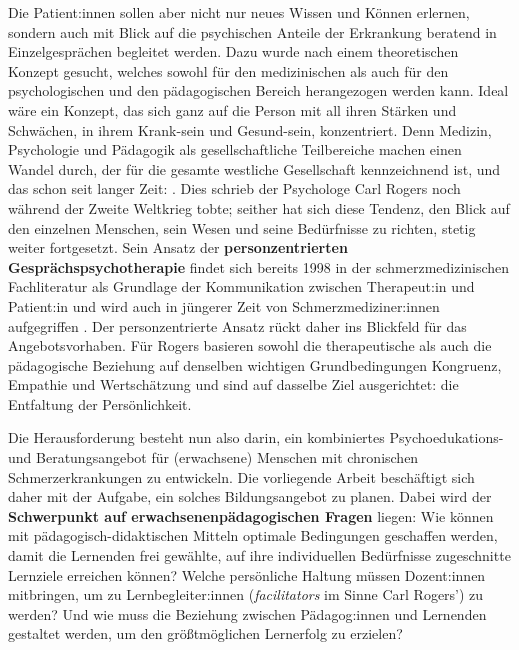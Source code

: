 \documentclass[
  twoside,
  parskip=half-,
]{scrreprt}
\begin{document}
    Die Patient:innen sollen aber nicht nur neues Wissen und Können erlernen, sondern auch mit Blick auf die psychischen Anteile der Erkrankung beratend in Einzelgesprächen begleitet werden. Dazu wurde nach einem theoretischen Konzept gesucht, welches sowohl für den medizinischen als auch für den psychologischen und den pädagogischen Bereich herangezogen werden kann. Ideal wäre ein Konzept, das sich ganz auf die Person mit all ihren Stärken und Schwächen, in ihrem Krank-sein und Gesund-sein, konzentriert. Denn Medizin, Psychologie und Pädagogik als gesellschaftliche Teilbereiche machen einen Wandel durch, der für die gesamte westliche Gesellschaft kennzeichnend ist, und das schon seit langer Zeit: . Dies schrieb der Psychologe Carl Rogers noch während der Zweite Weltkrieg tobte; seither hat sich diese Tendenz, den Blick auf den einzelnen Menschen, sein Wesen und seine Bedürfnisse zu richten, stetig weiter fortgesetzt. Sein Ansatz der \textbf{personzentrierten Gesprächspsychotherapie} findet sich bereits 1998 in der schmerzmedizinischen Fachliteratur als Grundlage der Kommunikation zwischen Therapeut:in und Patient:in \autocite[vgl.][62-65]{schmerztherapie} und wird auch in jüngerer Zeit von Schmerzmediziner:innen aufgegriffen \autocite[vgl.][]{fussnegger}.
    Der personzentrierte Ansatz rückt daher ins Blickfeld für das Angebotsvorhaben. Für Rogers basieren sowohl die therapeutische als auch die pädagogische Beziehung auf denselben wichtigen Grundbedingungen Kongruenz, Empathie und Wertschätzung und sind auf dasselbe Ziel ausgerichtet: die Entfaltung der Persönlichkeit. 

Die Herausforderung besteht nun also darin, ein kombiniertes Psychoedukations- und Beratungsangebot für (erwachsene) Menschen mit chronischen Schmerzerkrankungen zu entwickeln. Die vorliegende Arbeit beschäftigt sich daher mit der Aufgabe, ein solches Bildungsangebot zu planen. Dabei wird der \textbf{Schwerpunkt auf erwachsenenpädagogischen Fragen} liegen: Wie können mit pädagogisch-didaktischen Mitteln optimale Bedingungen geschaffen werden, damit die Lernenden frei gewählte, auf ihre individuellen Bedürfnisse zugeschnitte Lernziele erreichen können? Welche persönliche Haltung müssen Dozent:innen mitbringen, um zu Lernbegleiter:innen (\textit{facilitators} im Sinne Carl Rogers') zu werden? Und wie muss die Beziehung zwischen Pädagog:innen und Lernenden gestaltet werden, um den größtmöglichen Lernerfolg zu erzielen?
\end{document}
